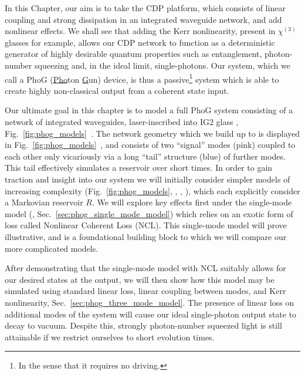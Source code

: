 In this Chapter, our aim is to take the CDP platform, which consists of linear coupling and strong dissipation in an integrated waveguide network, and add nonlinear effects. We shall see that adding the Kerr nonlinearity, present in $\chi^{\left(3\right)}$ glasses for example, allows our CDP network to function as a deterministic generator of highly desirable quantum properties such as entanglement, photon-number squeezing and, in the ideal limit, single-photons. Our system, which we call a PhoG (\underline{Pho}ton \underline{G}un) device, is thus a passive\footnote{In the sense that it requires no driving.} system which is able to create highly non-classical output from a coherent state input.


Our ultimate goal in this chapter is to model a full PhoG system consisting of a network of integrated waveguides, laser-inscribed into IG$2$ glass \cite{ig2}, Fig.~\ref{fig:phog_models}~\MakeUppercase{}. The network geometry which we build up to is displayed in Fig.~\ref{fig:phog_models}~\MakeUppercase{}, and consists of two ``signal'' modes (pink) coupled to each other only vicariously via a long ``tail'' structure (blue) of further modes. This tail effectively simulates a reservoir over short times. In order to gain traction and insight into our system we will initially consider simpler models of increasing complexity (Fig.~\ref{fig:phog_models}, \MakeUppercase{}, \MakeUppercase{}, \MakeUppercase{}), which each explicitly consider a Markovian reservoir $R$. We will explore key effects first under the single-mode model (\MakeUppercase{}, Sec.~\ref{sec:phog_single_mode_model}) which relies on an exotic form of loss called Nonlinear Coherent Loss (NCL). This single-mode model will prove illustrative, and is a foundational building block to which we will compare our more complicated models.


After demonstrating that the single-mode model with NCL suitably allows for our desired states at the output, we will then show how this model may be simulated using standard linear loss, linear coupling between modes, and Kerr nonlinearity, Sec.~\ref{sec:phog_three_mode_model}. The presence of linear loss on additional modes of the system will cause our ideal single-photon output state to decay to vacuum. Despite this, strongly photon-number squeezed light is still attainable if we restrict ourselves to short evolution times. 

